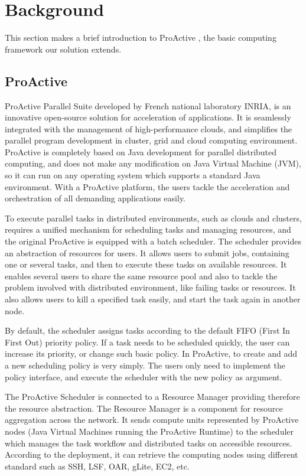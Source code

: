 \section{Background}

This section makes a brief introduction to ProActive \cite{huet04high}, the basic computing framework our solution extends.

\subsection{ProActive}

ProActive Parallel Suite developed by French national laboratory INRIA, is an innovative open-source solution for acceleration of applications. It is seamlessly integrated with the management of high-performance clouds, and simplifies the parallel program development in cluster, grid and cloud computing environment. ProActive is completely based on Java development for parallel distributed computing, and does not make any modification on Java Virtual Machine (JVM), so it can run on any operating system which supports a standard Java environment. With a ProActive platform, the users tackle the acceleration and orchestration of all demanding applications easily. %

To execute parallel tasks in distributed environments, such as clouds and clusters, requires a unified mechanism for scheduling tasks and managing resources, and the original ProActive is equipped with a batch scheduler. %
The scheduler provides an abstraction of resources for users. It allows users to submit jobs, containing one or several tasks, and then to execute these tasks on available resources. It enables several users to share the same resource pool and also to tackle the problem involved with distributed environment, like failing tasks or resources. It also allows users to kill a specified task easily, and start the task again in another node.

By default, the scheduler assigns tasks according to the default FIFO (First In First Out) priority policy. If a task needs to be scheduled quickly, the user can increase its priority, or change such basic policy. In ProActive, to create and add a new scheduling policy is very simply. The users only need to implement the policy interface, and execute the scheduler with the new policy as argument.

The ProActive Scheduler \cite{pascheduling} is connected to a Resource Manager \cite{parm} providing therefore the resource abstraction. The Resource Manager is a component for resource aggregation across the network. It sends compute units represented by ProActive nodes (Java Virtual Machines running the ProActive Runtime)   to the scheduler which manages the task workflow and distributed tasks on accessible resources. According to the deployment, it can retrieve the computing nodes using different standard such as SSH, LSF, OAR, gLite, EC2, etc.

